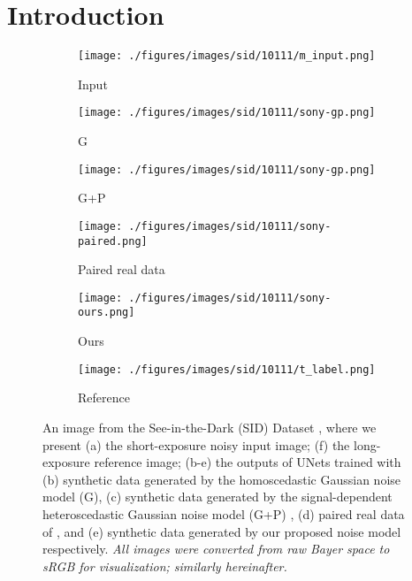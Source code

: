 \documentclass[10pt,twocolumn,letterpaper]{article}
\begin{document}
\section{Introduction}
\renewcommand*{\thefootnote}{\fnsymbol{footnote}}
\renewcommand*{\thefootnote}{\arabic{footnote}}
\setcounter{footnote}{0}
\begin{figure}[!htbp]
\centering
\begin{subfigure}[b]{.32\linewidth}
\centering
\texttt{[image: ./figures/images/sid/10111/m\_input.png]}
\caption{Input}
\end{subfigure}
\begin{subfigure}[b]{.32\linewidth}
\centering
\texttt{[image: ./figures/images/sid/10111/sony-gp.png]}
\caption{G}
\end{subfigure}
\begin{subfigure}[b]{.32\linewidth}
\centering
\texttt{[image: ./figures/images/sid/10111/sony-gp.png]}
\caption{G+P}
\end{subfigure}
\begin{subfigure}[b]{.32\linewidth}
\centering
\texttt{[image: ./figures/images/sid/10111/sony-paired.png]}
\caption{Paired real data}
\end{subfigure}
\begin{subfigure}[b]{.32\linewidth}
\centering
\texttt{[image: ./figures/images/sid/10111/sony-ours.png]}
\caption{Ours}
\end{subfigure}
\begin{subfigure}[b]{.32\linewidth}
\centering
\texttt{[image: ./figures/images/sid/10111/t\_label.png]}
\caption{Reference}
\end{subfigure} 
\caption{An image from the See-in-the-Dark (SID) Dataset \cite{Chen_2018_CVPR}, where we present (a) the short-exposure noisy input image; (f) the long-exposure reference image;  (b-e) the outputs of UNets \cite{ronneberger2015u} trained with (b) synthetic data generated by the  homoscedastic Gaussian noise model (G), (c) synthetic data generated by the signal-dependent heteroscedastic Gaussian noise model (G+P) \cite{Foi2008Practical},  (d) paired real data of \cite{Chen_2018_CVPR}, and (e) synthetic data generated by our proposed noise model respectively. \emph{All images were converted from raw Bayer space to sRGB for visualization; similarly hereinafter.}
}
\label{fig:example}
\end{figure}
\end{document}
